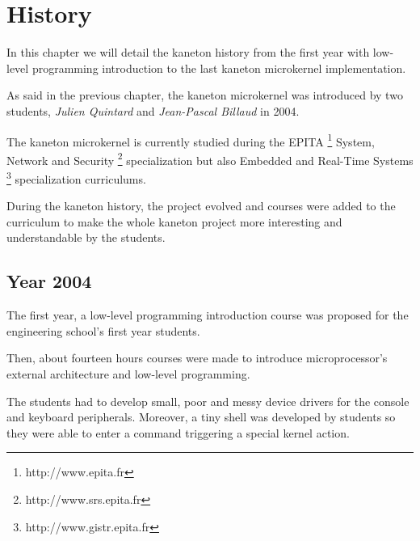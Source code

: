 %
%
%
%
%
%

%
%

\chapter{History}

In this chapter we will detail the kaneton history from the first
year with low-level programming introduction to the last kaneton
microkernel implementation.

\newpage

%
%

As said in the previous chapter, the kaneton microkernel was introduced
by two students, \textit{Julien Quintard} and \textit{Jean-Pascal Billaud}
in 2004.

The kaneton microkernel is currently studied during the
EPITA \footnote{http://www.epita.fr}
System, Network and Security \footnote{http://www.srs.epita.fr} specialization
but also
Embedded and Real-Time Systems \footnote{http://www.gistr.epita.fr}
specialization curriculums.

During the kaneton history, the project evolved and courses were added
to the curriculum to make the whole kaneton project more interesting and
understandable by the students.

%
%

\section{Year 2004}

The first year, a low-level programming introduction course was proposed
for the engineering school's first year students.

Then, about fourteen hours courses were made to introduce microprocessor's
external architecture and low-level programming.

The students had to develop small, poor and messy device drivers for the
console and keyboard peripherals. Moreover, a tiny shell was developed
by students so they were able to enter a command triggering a special
kernel action.

